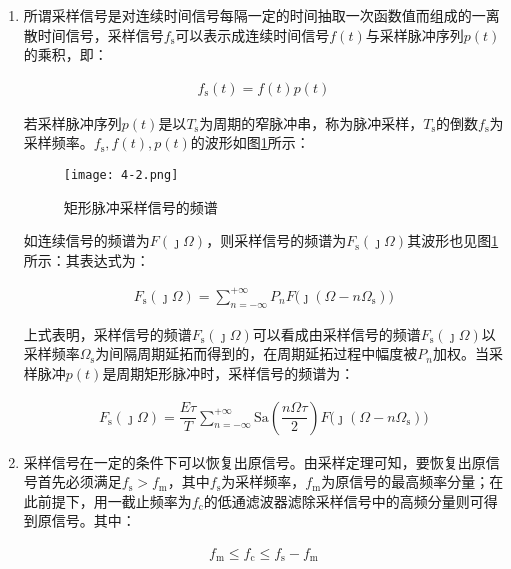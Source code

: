 \begin{enumerate}
	\item 所谓采样信号是对连续时间信号每隔一定的时间抽取一次函数值而组成的一离散时间信号，采样信号$ f_\text{s} $可以表示成连续时间信号$ f(t) $与采样脉冲序列$ p(t) $的乘积，即：

		\begin{align}
			f_\text{s}(t)=f(t)p(t)
		\end{align}

		若采样脉冲序列$ p(t) $是以$ T_\text{s} $为周期的窄脉冲串，称为脉冲采样，$ T_\text{s} $的倒数$ f_\text{s} $为采样频率。$ f_\text{s},f(t),p(t) $的波形如图\ref{fig:矩形脉冲采样信号的频谱}所示：

		\begin{figure}[htpb]
			\centering
			\texttt{[image: 4-2.png]}
			\caption{矩形脉冲采样信号的频谱}
			\label{fig:矩形脉冲采样信号的频谱}
		\end{figure}

		如连续信号的频谱为$ F(\jmath\Omega) $，则采样信号的频谱为$ F_\text{s}(\jmath\Omega) $其波形也见图\ref{fig:矩形脉冲采样信号的频谱}所示：其表达式为：

		\begin{align}
			F_\text{s}(\jmath\Omega)=\sum\limits_{n=-\infty}^{+\infty}P_nF\big(\jmath(\Omega-n\Omega_\text{s})\big)
		\end{align}

		上式表明，采样信号的频谱$ F_\text{s}(\jmath\Omega) $可以看成由采样信号的频谱$ F_\text{s}(\jmath\Omega) $以采样频率$ \Omega_\text{s} $为间隔周期延拓而得到的，在周期延拓过程中幅度被$ P_n $加权。当采样脉冲$ p(t) $是周期矩形脉冲时，采样信号的频谱为：

		\begin{align}
			F_\text{s}(\jmath\Omega)=\dfrac{E\tau}{T}\sum\limits_{n=-\infty}^{+\infty}\text{Sa}(\dfrac{n\Omega\tau}{2})F\big(\jmath(\Omega-n\Omega_\text{s})\big)
		\end{align}

	\item 采样信号在一定的条件下可以恢复出原信号。由采样定理可知，要恢复出原信号首先必须满足$ f_\text{s}>f_\text{m} $，其中$ f_\text{s} $为采样频率，$ f_\text{m} $为原信号的最高频率分量；在此前提下，用一截止频率为$ f_\text{c} $的低通滤波器滤除采样信号中的高频分量则可得到原信号。其中：

		\begin{align}
			f_\text{m}\leqslant f_\text{c}\leqslant f_\text{s}-f_\text{m}
		\end{align}


\end{enumerate}
